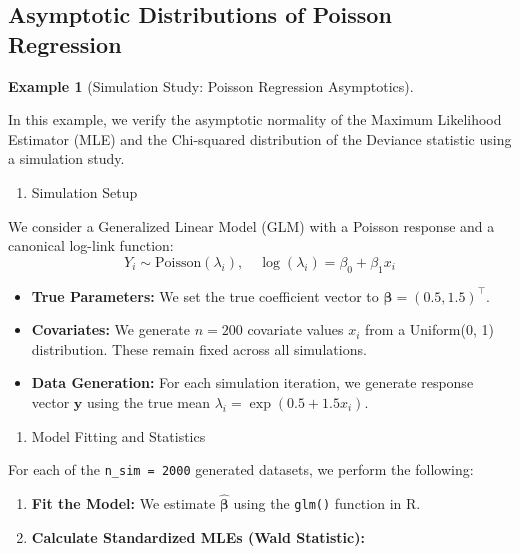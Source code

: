 \documentclass[
  letterpaper,
  DIV=11,
  numbers=noendperiod]{scrreprt}
\providecommand{\tightlist}{%
  \setlength{\itemsep}{0pt}\setlength{\parskip}{0pt}}
\renewcommand{\[}{\begin{equation}}
\renewcommand{\]}{\end{equation}}
\theoremstyle{definition}
\theoremstyle{plain}
\theoremstyle{plain}
\theoremstyle{plain}
\theoremstyle{definition}
\newtheorem{example}{Example}[chapter]
\theoremstyle{plain}
\theoremstyle{remark}
\begin{document}
\subsection{Asymptotic Distributions of Poisson
Regression}\label{asymptotic-distributions-of-poisson-regression}

\begin{example}[Simulation Study: Poisson Regression
Asymptotics]\protect\hypertarget{exm-pr-asym}{}\label{exm-pr-asym}

In this example, we verify the asymptotic normality of the Maximum
Likelihood Estimator (MLE) and the Chi-squared distribution of the
Deviance statistic using a simulation study.

\begin{enumerate}
\def\labelenumi{\arabic{enumi}.}
\tightlist
\item
  Simulation Setup
\end{enumerate}

We consider a Generalized Linear Model (GLM) with a Poisson response and
a canonical log-link function: \[
Y_i \sim \text{Poisson}(\lambda_i), \quad \log(\lambda_i) = \beta_0 + \beta_1 x_i
\]

\begin{itemize}
\tightlist
\item
  \textbf{True Parameters:} We set the true coefficient vector to
  \(\boldsymbol{\beta} = (0.5, 1.5)^\top\).
\item
  \textbf{Covariates:} We generate \(n=200\) covariate values \(x_i\)
  from a Uniform(0, 1) distribution. These remain fixed across all
  simulations.
\item
  \textbf{Data Generation:} For each simulation iteration, we generate
  response vector \(\mathbf{y}\) using the true mean
  \(\lambda_i = \exp(0.5 + 1.5 x_i)\).
\end{itemize}

\begin{enumerate}
\def\labelenumi{\arabic{enumi}.}
\setcounter{enumi}{1}
\tightlist
\item
  Model Fitting and Statistics
\end{enumerate}

For each of the \texttt{n\_sim\ =\ 2000} generated datasets, we perform
the following:

\begin{enumerate}
\def\labelenumi{\arabic{enumi}.}
\item
  \textbf{Fit the Model:} We estimate \(\hat{\boldsymbol{\beta}}\) using
  the \texttt{glm()} function in R.
\item
  \textbf{Calculate Standardized MLEs (Wald Statistic):}


\end{enumerate}
\end{example}
\end{document}
